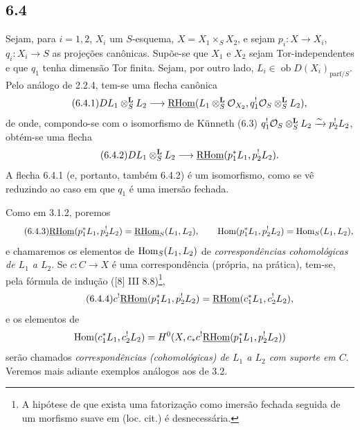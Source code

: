 \subsection*{6.4}
Sejam, para $i=1,2$, $X_i$ um $S$-esquema, $X=X_1\times_SX_2$, e sejam $p_i:X\to X_i$, $q_i:X_i\to S$ as projeções canônicas. Supõe-se que $X_1$ e $X_2$ sejam Tor-independentes e que $q_1$ tenha dimensão Tor finita. Sejam, por outro lado, $L_i\in\operatorname{ob}D(X_i)_{\mathrm{parf}/S}$. Pelo análogo de 2.2.4, tem-se uma flecha canônica
\begin{equation}
\tag{6.4.1}
DL_1\otimes_S^{\mathbf L}L_2\longrightarrow \underline{\mathrm{RHom}}(L_1\otimes_S^{\mathbf L}\mathcal{O}_{X_2},q_1^!\mathcal{O}_S\otimes_S^{\mathbf L}L_2),
\end{equation}
de onde, compondo-se com o isomorfismo de Künneth (6.3) $q_1^!\mathcal{O}_S\otimes_S^{\mathbf L}L_2\xrightarrow{\sim}p_2^!L_2$, obtém-se uma flecha
\begin{equation}
\tag{6.4.2}
DL_1\otimes_S^{\mathbf L}L_2\longrightarrow\underline{\mathrm{RHom}}(p_1^*L_1,p_2^!L_2).
\end{equation}
A flecha 6.4.1 (e, portanto, também 6.4.2) é um isomorfismo, como se vê reduzindo ao caso em que $q_1$ é uma imersão fechada.

Como em 3.1.2, poremos
\begin{equation}
\tag{6.4.3}
\underline{\mathrm{RHom}}(p_1^*L_1,p_2^!L_2)=\underline{\mathrm{RHom}}_S(L_1,L_2),\qquad
\operatorname{Hom}(p_1^*L_1,p_2^!L_2)=\operatorname{Hom}_S(L_1,L_2),
\end{equation}
e chamaremos os elementos de $\operatorname{Hom}_S(L_1,L_2)$ de \emph{correspondências cohomológicas de $L_1$ a $L_2$}. Se $c:C\to X$ é uma correspondência (própria, na prática), tem-se, pela fórmula de indução ([8] III 8.8)\footnote{A hipótese de que exista uma fatorização como imersão fechada seguida de um morfismo suave em (loc. cit.) é desnecessária.},
\begin{equation}
\tag{6.4.4}
c^!\underline{\mathrm{RHom}}(p_1^*L_1,p_2^!L_2)=\underline{\mathrm{RHom}}(c_1^*L_1,c_2^!L_2),
\end{equation}
e os elementos de
\[
\operatorname{Hom}(c_1^*L_1,c_2^!L_2)=H^0(X,c_*c^!\underline{\mathrm{RHom}}(p_1^*L_1,p_2^!L_2))
\]
serão chamados \emph{correspondências (cohomológicas) de $L_1$ a $L_2$ com suporte em $C$}. Veremos mais adiante exemplos análogos aos de 3.2.

